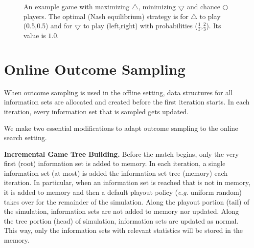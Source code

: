 \documentclass[letterpaper]{article}
\newcommand{\defword}[1]{\textbf{\boldmath{#1}}}
\newcommand{\eg}{{\it e.g.}\xspace}
\begin{document}
\begin{figure}
\begin{center}
\end{center}
\caption{An example game with maximizing $\bigtriangleup$, minimizing $\bigtriangledown$ and chance $\bigcirc$ players. The optimal (Nash equilibrium) strategy is for $\bigtriangleup$ to play (0.5,0.5) and for $\bigtriangledown$ to play (left,right) with probabilities ($\frac{1}{3}$,$\frac{2}{3}$). Its value is $1.0$.}\label{fig:coordGame}
\end{figure}


\section{Online Outcome Sampling}


When outcome sampling is used in the offline setting, data structures for all information sets are allocated and created 
before the first iteration starts. In each iteration, every information set that is sampled gets updated. 

We make two essential modifications to adapt outcome sampling to the online search setting.

{\bf Incremental Game Tree Building.} Before the match begins, only the very first (root) information set is added to memory. 
In each iteration, a single information set (at most) is added the information set tree (memory) each iteration.
In particular, when an information set is reached that is not in memory, it is added to memory and then a default 
playout policy (\eg uniform random) takes over for the remainder of the simulation.
Along the playout portion (tail) of the simulation, information sets are not added to memory nor updated.
Along the tree portion (head) of simulation, information sets are updated as normal. 
This way, only the information sets with relevant statistics will be stored in the memory.
\end{document}
